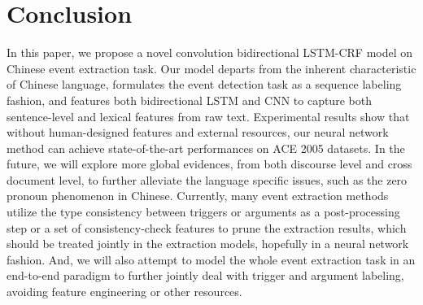 \section{Conclusion}\label{conclude}
In this paper, we propose a novel convolution bidirectional LSTM-CRF model on Chinese event extraction task. Our model departs from the inherent characteristic of Chinese language, formulates the event detection task as a sequence labeling fashion, and features both bidirectional LSTM and CNN to capture both sentence-level and lexical features from raw text. Experimental results show that without human-designed features and external resources, our neural network method can achieve state-of-the-art performances on ACE 2005 datasets. In the future, we will explore more global evidences, from both discourse level and cross document level,  to further alleviate the language specific issues, such as the zero pronoun phenomenon in Chinese. Currently, many event extraction methods utilize the type consistency between triggers or arguments as a post-processing step or a set of consistency-check features to prune the extraction results, which should be treated jointly in the extraction models, hopefully in a neural network fashion. And, we will also attempt to model the whole event extraction task  in an end-to-end paradigm to further jointly deal with trigger and argument labeling, avoiding feature engineering or other resources.   